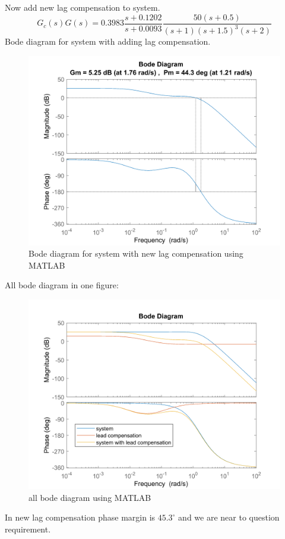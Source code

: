Now add new lag compensation to system.
$$
G_c(s)G(s) = 0.3983 \dfrac{s + 0.1202}{s + 0.0093}\dfrac{50(s+0.5)}{(s+1)(s+1.5)^{3}(s+2)}
$$
Bode diagram for system with adding lag compensation.
\begin{figure}[H]
	\caption{Bode diagram for system with new lag compensation using MATLAB}
	\centering
	\includegraphics[width=12cm]{../Figure/Q1/b/new2_margin.png}
\end{figure}
All bode diagram in one figure:
\begin{figure}[H]
	\caption{all bode diagram using MATLAB}
	\centering
	\includegraphics[width=12cm]{../Figure/Q1/b/new_all_in_one.png}
\end{figure}
In new lag compensation phase margin is $45.3^{\circ}$ and we are near to question requirement.